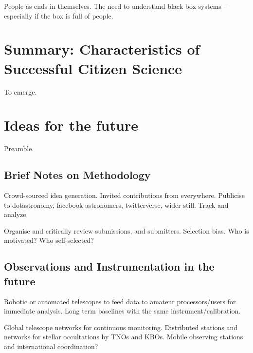 \documentclass{ar2e}
\begin{document}
People as ends in themselves. The need to understand black box systems --
especially if the box is full of people. 



\section{Summary: Characteristics of Successful Citizen Science}
\label{sec:summary}

To emerge.



\section{Ideas for the future}
\label{sec:future}

Preamble.


\subsection{Brief Notes on Methodology}
\label{sec:future:method}

Crowd-sourced idea generation.  Invited contributions from everywhere. 
Publicise to dotastronomy, facebook astronomers, twitterverse, wider still.
Track and analyze.

Organise and critically review submissions, and submitters. Selection bias.
Who is motivated? Who self-selected? 


\subsection{Observations and Instrumentation in the future}
\label{sec:future:obs}

Robotic or automated telescopes to feed data to amateur processors/users for
immediate analysis.  Long term baselines with the same 
instrument/calibration.

Global telescope networks for continuous monitoring.
Distributed stations and networks for stellar occultations by TNOs and KBOs. 
Mobile observing stations and international coordination?
\end{document}
